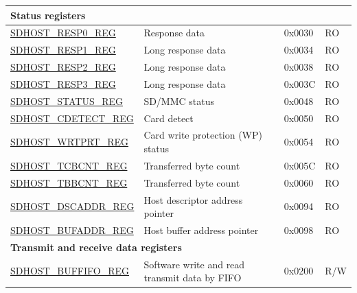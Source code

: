 \begin{longtable}{ | p{6cm} | p{7.0cm} | p{1.3cm} | p{1.2cm} | }
\multicolumn{4}{|l|}{\textbf{Status registers}} \\ \hline
\hyperref[regdesc:SDHOSTRESP0REG]{SDHOST\_RESP0\_REG} & Response data & 0x0030 & RO \\ \hline
\hyperref[regdesc:SDHOSTRESP1REG]{SDHOST\_RESP1\_REG} & Long response data & 0x0034 & RO \\ \hline
\hyperref[regdesc:SDHOSTRESP2REG]{SDHOST\_RESP2\_REG} & Long response data & 0x0038 & RO \\ \hline
\hyperref[regdesc:SDHOSTRESP3REG]{SDHOST\_RESP3\_REG} & Long response data & 0x003C & RO \\ \hline
\hyperref[regdesc:SDHOSTSTATUSREG]{SDHOST\_STATUS\_REG} & SD/MMC status & 0x0048 & RO \\ \hline
\hyperref[regdesc:SDHOSTCDETECTREG]{SDHOST\_CDETECT\_REG} & Card detect & 0x0050 & RO \\ \hline
\hyperref[regdesc:SDHOSTWRTPRTREG]{SDHOST\_WRTPRT\_REG} & Card write protection (WP) status & 0x0054 & RO \\ \hline
\hyperref[regdesc:SDHOSTTCBCNTREG]{SDHOST\_TCBCNT\_REG} & Transferred byte count & 0x005C & RO \\ \hline
\hyperref[regdesc:SDHOSTTBBCNTREG]{SDHOST\_TBBCNT\_REG} & Transferred byte count & 0x0060 & RO \\ \hline
\hyperref[regdesc:SDHOSTDSCADDRREG]{SDHOST\_DSCADDR\_REG} & Host descriptor address pointer & 0x0094 & RO \\ \hline
\hyperref[regdesc:SDHOSTBUFADDRREG]{SDHOST\_BUFADDR\_REG} & Host buffer address pointer & 0x0098 & RO \\ \hline

\multicolumn{4}{|l|}{\textbf{Transmit and receive data registers}} \\ \hline
\hyperref[regdesc:SDHOSTBUFFIFOREG]{SDHOST\_BUFFIFO\_REG} & Software write and read transmit data by FIFO & 0x0200 & R/W \\ \hline
\end{longtable}